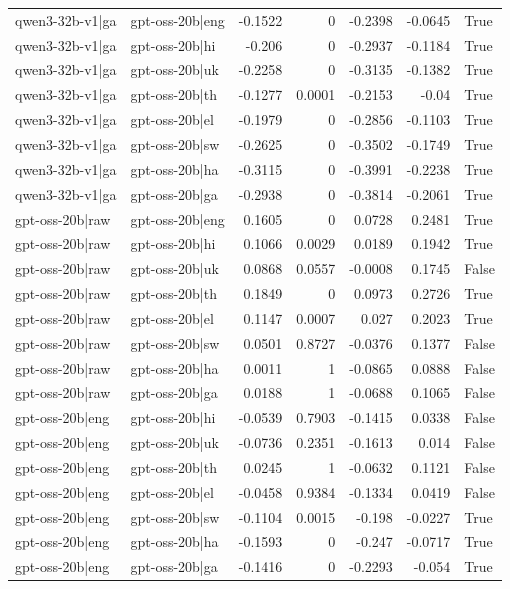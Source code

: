 \begin{table}
\begin{tabular}{l l r r r r l}
qwen3-32b-v1|ga & gpt-oss-20b|eng & -0.1522 & 0 & -0.2398 & -0.0645 & True \\
qwen3-32b-v1|ga & gpt-oss-20b|hi & -0.206 & 0 & -0.2937 & -0.1184 & True \\
qwen3-32b-v1|ga & gpt-oss-20b|uk & -0.2258 & 0 & -0.3135 & -0.1382 & True \\
qwen3-32b-v1|ga & gpt-oss-20b|th & -0.1277 & 0.0001 & -0.2153 & -0.04 & True \\
qwen3-32b-v1|ga & gpt-oss-20b|el & -0.1979 & 0 & -0.2856 & -0.1103 & True \\
qwen3-32b-v1|ga & gpt-oss-20b|sw & -0.2625 & 0 & -0.3502 & -0.1749 & True \\
qwen3-32b-v1|ga & gpt-oss-20b|ha & -0.3115 & 0 & -0.3991 & -0.2238 & True \\
qwen3-32b-v1|ga & gpt-oss-20b|ga & -0.2938 & 0 & -0.3814 & -0.2061 & True \\
gpt-oss-20b|raw & gpt-oss-20b|eng & 0.1605 & 0 & 0.0728 & 0.2481 & True \\
gpt-oss-20b|raw & gpt-oss-20b|hi & 0.1066 & 0.0029 & 0.0189 & 0.1942 & True \\
gpt-oss-20b|raw & gpt-oss-20b|uk & 0.0868 & 0.0557 & -0.0008 & 0.1745 & False \\
gpt-oss-20b|raw & gpt-oss-20b|th & 0.1849 & 0 & 0.0973 & 0.2726 & True \\
gpt-oss-20b|raw & gpt-oss-20b|el & 0.1147 & 0.0007 & 0.027 & 0.2023 & True \\
gpt-oss-20b|raw & gpt-oss-20b|sw & 0.0501 & 0.8727 & -0.0376 & 0.1377 & False \\
gpt-oss-20b|raw & gpt-oss-20b|ha & 0.0011 & 1 & -0.0865 & 0.0888 & False \\
gpt-oss-20b|raw & gpt-oss-20b|ga & 0.0188 & 1 & -0.0688 & 0.1065 & False \\
gpt-oss-20b|eng & gpt-oss-20b|hi & -0.0539 & 0.7903 & -0.1415 & 0.0338 & False \\
gpt-oss-20b|eng & gpt-oss-20b|uk & -0.0736 & 0.2351 & -0.1613 & 0.014 & False \\
gpt-oss-20b|eng & gpt-oss-20b|th & 0.0245 & 1 & -0.0632 & 0.1121 & False \\
gpt-oss-20b|eng & gpt-oss-20b|el & -0.0458 & 0.9384 & -0.1334 & 0.0419 & False \\
gpt-oss-20b|eng & gpt-oss-20b|sw & -0.1104 & 0.0015 & -0.198 & -0.0227 & True \\
gpt-oss-20b|eng & gpt-oss-20b|ha & -0.1593 & 0 & -0.247 & -0.0717 & True \\
gpt-oss-20b|eng & gpt-oss-20b|ga & -0.1416 & 0 & -0.2293 & -0.054 & True \\

\end{tabular}
\end{table}
